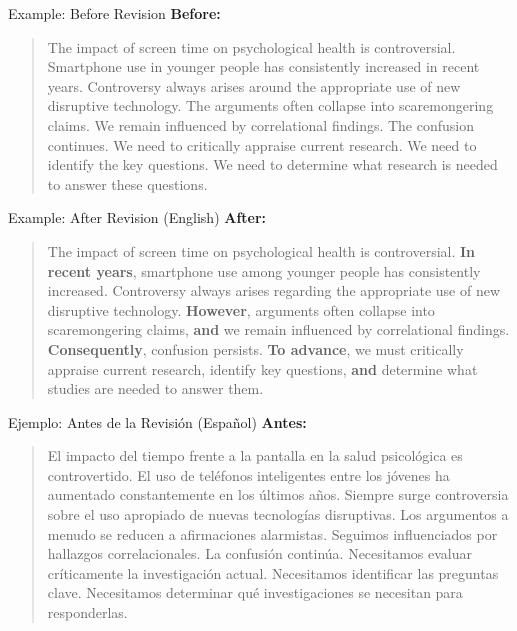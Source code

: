 \begin{frame}{Example: Before Revision}
  \textbf{Before:}
  \begin{quote}
    The impact of screen time on psychological health is controversial.
    Smartphone use in younger people has consistently increased in recent years.
    Controversy always arises around the appropriate use of new disruptive
    technology.
    The arguments often collapse into scaremongering claims.
    We remain influenced by correlational findings.
    The confusion continues.
    We need to critically appraise current research.
    We need to identify the key questions.
    We need to determine what research is needed to answer these questions.
  \end{quote}
\end{frame}

\begin{frame}{Example: After Revision (English)}
  \textbf{After:}
  \begin{quote}
    The impact of screen time on psychological health is controversial.
    \textbf{In recent years}, smartphone use among younger people has
    consistently increased.
    Controversy always arises regarding the appropriate use of new disruptive
    technology.
    \textbf{However}, arguments often collapse into scaremongering claims,
    \textbf{and} we remain influenced by correlational findings.
    \textbf{Consequently}, confusion persists.
    \textbf{To advance}, we must critically appraise current research, identify
    key questions, \textbf{and} determine what studies are needed to answer them.
  \end{quote}
\end{frame}

\begin{frame}{Ejemplo: Antes de la Revisión (Español)}
  \textbf{Antes:}
  \begin{quote}
    El impacto del tiempo frente a la pantalla en la salud psicológica es
    controvertido.
    El uso de teléfonos inteligentes entre los jóvenes ha aumentado
    constantemente en los últimos años.
    Siempre surge controversia sobre el uso apropiado de nuevas tecnologías disruptivas.
    Los argumentos a menudo se reducen a afirmaciones alarmistas.
    Seguimos influenciados por hallazgos correlacionales.
    La confusión continúa.
    Necesitamos evaluar críticamente la investigación actual.
    Necesitamos identificar las preguntas clave.
    Necesitamos determinar qué investigaciones se necesitan para responderlas.
  \end{quote}
\end{frame}

